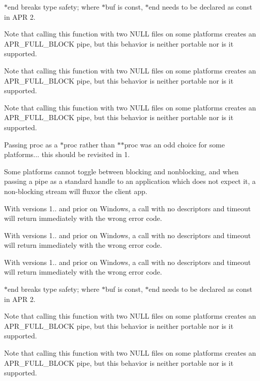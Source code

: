 \begin{DoxyRefList}
$\ast$end breaks type safety; where $\ast$buf is const, $\ast$end needs to be declared as const in A\+PR 2. 

Note that calling this function with two N\+U\+LL files on some platforms creates an A\+P\+R\+\_\+\+F\+U\+L\+L\+\_\+\+B\+L\+O\+CK pipe, but this behavior is neither portable nor is it supported.

Note that calling this function with two N\+U\+LL files on some platforms creates an A\+P\+R\+\_\+\+F\+U\+L\+L\+\_\+\+B\+L\+O\+CK pipe, but this behavior is neither portable nor is it supported.

Note that calling this function with two N\+U\+LL files on some platforms creates an A\+P\+R\+\_\+\+F\+U\+L\+L\+\_\+\+B\+L\+O\+CK pipe, but this behavior is neither portable nor is it supported.

Passing proc as a $\ast$proc rather than $\ast$$\ast$proc was an odd choice for some platforms... this should be revisited in 1.  
\item[\label{bug__bug000002}%
\Hypertarget{bug__bug000002}%
Member \mbox{\hyperlink{group__apr__time_ga57bfe39a9516843a151a65cd02f84616}{A\+P\+R\+\_\+\+D\+E\+C\+L\+A\+RE}} (apr\+\_\+status\+\_\+t) apr\+\_\+time\+\_\+ansi\+\_\+put(apr\+\_\+time\+\_\+t $\ast$result]Some platforms cannot toggle between blocking and nonblocking, and when passing a pipe as a standard handle to an application which does not expect it, a non-\/blocking stream will fluxor the client app. 

With versions 1.. and prior on Windows, a call with no descriptors and timeout will return immediately with the wrong error code. 

With versions 1.. and prior on Windows, a call with no descriptors and timeout will return immediately with the wrong error code. 

With versions 1.. and prior on Windows, a call with no descriptors and timeout will return immediately with the wrong error code. 

$\ast$end breaks type safety; where $\ast$buf is const, $\ast$end needs to be declared as const in A\+PR 2. 

Note that calling this function with two N\+U\+LL files on some platforms creates an A\+P\+R\+\_\+\+F\+U\+L\+L\+\_\+\+B\+L\+O\+CK pipe, but this behavior is neither portable nor is it supported.

Note that calling this function with two N\+U\+LL files on some platforms creates an A\+P\+R\+\_\+\+F\+U\+L\+L\+\_\+\+B\+L\+O\+CK pipe, but this behavior is neither portable nor is it supported.


\end{DoxyRefList}
